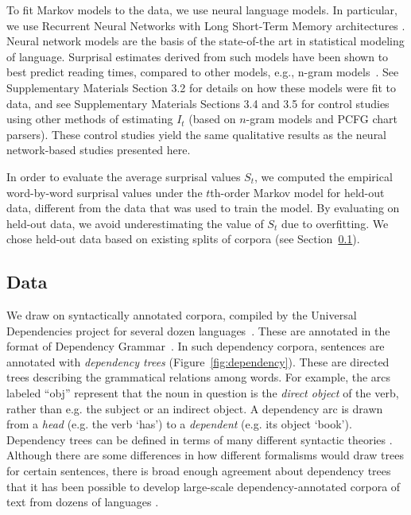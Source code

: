 To fit Markov models to the data, we use neural language models. In particular, we use Recurrent Neural Networks with Long Short-Term Memory architectures \citep{hochreiter-long-1997}. 
Neural network models are the basis of the state-of-the art in statistical modeling of language. Surprisal estimates derived from such models have been shown to best predict reading times, compared to other models, e.g., n-gram models~\citep{frank-insensitivity-2011,goodkind-predictive-2018}.
See Supplementary Materials Section 3.2 for details on how these models were fit to data, and see Supplementary Materials Sections 3.4 and 3.5 for control studies using other methods of estimating $I_t$ (based on $n$-gram models and PCFG chart parsers). These control studies yield the same qualitative results as the neural network-based studies presented here.

In order to evaluate the average surprisal values $S_t$, we computed the empirical word-by-word surprisal values under the $t$th-order Markov model for held-out data, different from the data that was used to train the model. By evaluating on held-out data, we avoid underestimating the value of $S_t$ due to overfitting.
We chose held-out data based on existing splits of corpora (see Section~\ref{sec:exp2-data}).




\subsection{Data}\label{sec:exp2-data}
We draw on syntactically annotated corpora, compiled by the Universal Dependencies project for several dozen languages~\citep{nivre-universal-2017}.
These are annotated in the format of Dependency Grammar~\citep{hays1964dependency,hudson1984word,melcuk1988dependency,corbett1993heads,tesniere2015elements}.
In such dependency corpora, sentences are annotated with \emph{dependency trees} (Figure~\ref{fig:dependency}).
These are directed trees describing the grammatical relations among words. For example, the arcs labeled ``obj'' represent that the noun in question is the \emph{direct object} of the verb, rather than e.g. the subject or an indirect object.
A dependency arc is drawn from a \emph{head} (e.g. the verb `has') to a \emph{dependent} (e.g. its object `book').
Dependency trees can be defined in terms of many different syntactic theories \citep{corbett1993heads}.
Although there are some differences in how different formalisms would draw trees for certain sentences, there is broad enough agreement about dependency trees that it has been possible to develop large-scale dependency-annotated corpora of text from dozens of languages \citep{nivre2017universal}.

